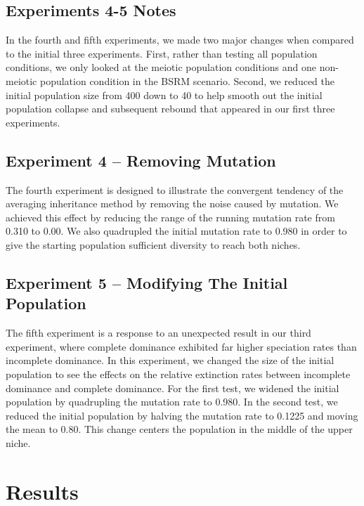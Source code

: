 \documentclass{article}
\begin{document}
\subsection{Experiments 4-5 Notes}

In the fourth and fifth experiments, we made two major changes when compared to the initial three experiments. First, rather than testing all population conditions, we only looked at the meiotic population conditions and one non-meiotic population condition in the BSRM scenario. Second, we reduced the initial population size from 400 down to 40 to help smooth out the initial population collapse and subsequent rebound that appeared in our first three experiments.

\subsection{Experiment 4 -- Removing Mutation}

The fourth experiment is designed to illustrate the convergent tendency of the averaging inheritance method by removing the noise caused by mutation. We achieved this effect by reducing the range of the running mutation rate from 0.310 to 0.00. We also quadrupled the initial mutation rate to 0.980 in order to give the starting population sufficient diversity to reach both niches. 

\subsection{Experiment 5 -- Modifying The Initial Population}

The fifth experiment is a response to an unexpected result in our third experiment, where complete dominance exhibited far higher speciation rates than incomplete dominance. In this experiment, we changed the size of the initial population to see the effects on the relative extinction rates between incomplete dominance and complete dominance. For the first test, we widened the initial population by quadrupling the mutation rate to 0.980. In the second test, we reduced the initial population by halving the mutation rate to 0.1225 and moving the mean to 0.80. This change centers the population in the middle of the upper niche.



\section{Results}
\end{document}
